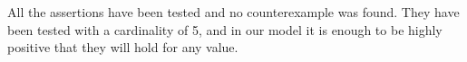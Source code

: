 All the assertions have been tested and no counterexample was found.
They have been tested with a cardinality of 5, and in our model
it is enough to be highly positive that they will hold for any value.
